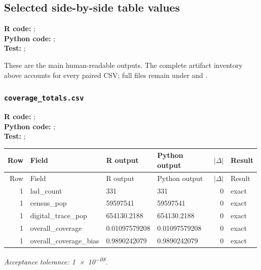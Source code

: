 \documentclass[10pt]{article}
\begin{document}
\subsection{Selected side-by-side table values}
{\footnotesize \textbf{R code:} ; \\ \textbf{Python code:} ; \\ \textbf{Test:} ; \par}


These are the main human-readable outputs. The complete artifact inventory above accounts for every paired CSV; full files remain under  and .

\subsubsection{\texorpdfstring{\texttt{coverage\_totals.csv}}{coverage\_totals.csv}}
{\footnotesize \textbf{R code:} ; \\ \textbf{Python code:} ; \\ \textbf{Test:} ; \par}

\small
\begin{longtable}{@{}r p{}p{}p{}rl@{}}
\toprule
Row & Field & R output & Python output & $|\Delta|$ & Result \\
\midrule
\endfirsthead
\toprule
Row & Field & R output & Python output & $|\Delta|$ & Result \\
\midrule
\endhead
1 & lad\_\allowbreak{}count & 331 & 331 & 0 & exact \\
1 & census\_\allowbreak{}pop & 59597541 & 59597541 & 0 & exact \\
1 & digital\_\allowbreak{}trace\_\allowbreak{}pop & 654130.2188 & 654130.2188 & 0 & exact \\
1 & overall\_\allowbreak{}coverage & 0.01097579208 & 0.01097579208 & 0 & exact \\
1 & overall\_\allowbreak{}coverage\_\allowbreak{}bias & 0.9890242079 & 0.9890242079 & 0 & exact \\
\bottomrule
\end{longtable}
\normalsize
\textit{Acceptance tolerance: \num{1e-08}.}
\end{document}
